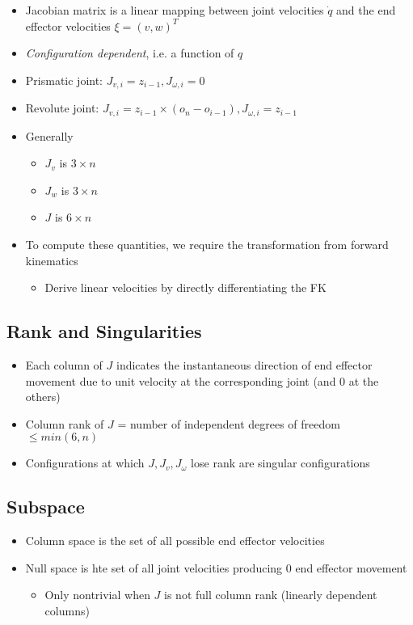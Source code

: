   \begin{itemize}
    \item Jacobian matrix is a linear mapping between joint velocities
    $ \dot{q} $ and the end effector velocities $ \xi = (v, w)^{T} $
    \item \emph{Configuration dependent}, i.e. a function of $ q $
    \item Prismatic joint: $ J_{v, i} = z_{i - 1}, J_{\omega, i} = 0 $
    \item Revolute joint:
    $ J_{v, i} = z_{i - 1} \times \left( o_{n} - o_{i - 1} \right), J_{\omega, i} = z_{i - 1} $
    \item Generally
    \begin{itemize}
      \item $ J_{v} $ is $ 3 \times n $
      \item $ J_{w} $ is $ 3 \times n $
      \item $ J $ is $ 6 \times n $
    \end{itemize}

    \item To compute these quantities, we require the transformation from
    forward kinematics
    \begin{itemize}
      \item Derive linear velocities by directly differentiating the FK
    \end{itemize}
  \end{itemize}

  \subsection{Rank and Singularities}

    \begin{itemize}
      \item Each column of $ J $ indicates the instantaneous direction of end
      effector movement due to unit velocity at the corresponding joint (and 0 at the others)
      \item Column rank of $ J $ = number of independent degrees of freedom $ \le min(6, n ) $
      \item Configurations at which $ J, J_{v}, J_{\omega} $ lose rank are singular configurations
    \end{itemize}

  \subsection{Subspace}

    \begin{itemize}
      \item Column space is the set of all possible end effector velocities
      \item Null space is hte set of all joint velocities producing 0 end effector movement
      \begin{itemize}
        \item Only nontrivial when $ J $ is not full column rank (linearly dependent columns)
      \end{itemize}
    \end{itemize}
